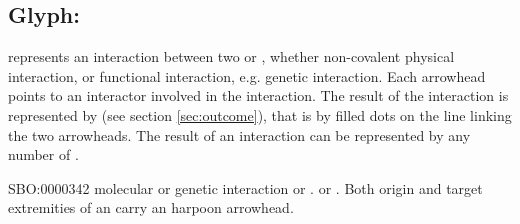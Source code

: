 \color{blue}

\subsection{Glyph: }\label{sec:interaction}

 represents an interaction between two  or , whether non-covalent physical interaction, or functional interaction, e.g. genetic interaction. Each arrowhead points to an interactor involved in the interaction. The result of the interaction is represented by  (see section \ref{sec:outcome}), that is by filled dots on the line linking the two arrowheads. The result of an interaction can be represented by any number of .

\begin{glyphDescription}
 \glyphSboTerm SBO:0000342 molecular or genetic interaction
 \glyphOrigin {}  or  .
 \glyphTarget {}  or  .
 \glyphEndPoint Both origin and target extremities of an  carry an harpoon arrowhead.
 \end{glyphDescription}

\begin{center}
\end{center}


 
% 
\normalcolor

\newpage